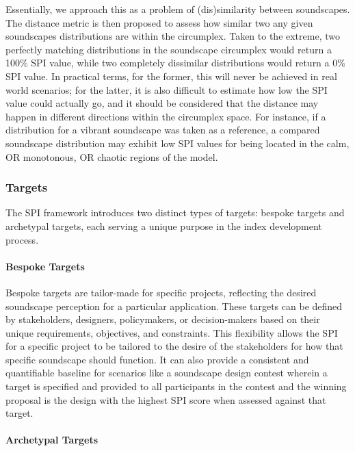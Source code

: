 \documentclass[
  authoryear,
  preprint,
  3p]{elsarticle}
\let\oldparagraph\paragraph
\renewcommand{\paragraph}[1]{\oldparagraph{#1}\mbox{}}
\begin{document}
Essentially, we approach this as a problem of (dis)similarity between
soundscapes. The distance metric is then proposed to assess how similar
two any given soundscapes distributions are within the circumplex. Taken
to the extreme, two perfectly matching distributions in the soundscape
circumplex would return a 100\% SPI value, while two completely
dissimilar distributions would return a 0\% SPI value. In practical
terms, for the former, this will never be achieved in real world
scenarios; for the latter, it is also difficult to estimate how low the
SPI value could actually go, and it should be considered that the
distance may happen in different directions within the circumplex space.
For instance, if a distribution for a vibrant soundscape was taken as a
reference, a compared soundscape distribution may exhibit low SPI values
for being located in the calm, OR monotonous, OR chaotic regions of the
model.

\subsubsection{Targets}\label{targets}

The SPI framework introduces two distinct types of targets: bespoke
targets and archetypal targets, each serving a unique purpose in the
index development process.

\paragraph{Bespoke Targets}\label{bespoke-targets}

Bespoke targets are tailor-made for specific projects, reflecting the
desired soundscape perception for a particular application. These
targets can be defined by stakeholders, designers, policymakers, or
decision-makers based on their unique requirements, objectives, and
constraints. This flexibility allows the SPI for a specific project to
be tailored to the desire of the stakeholders for how that specific
soundscape should function. It can also provide a consistent and
quantifiable baseline for scenarios like a soundscape design contest
wherein a target is specified and provided to all participants in the
contest and the winning proposal is the design with the highest SPI
score when assessed against that target.

\paragraph{Archetypal Targets}\label{archetypal-targets}
\end{document}
